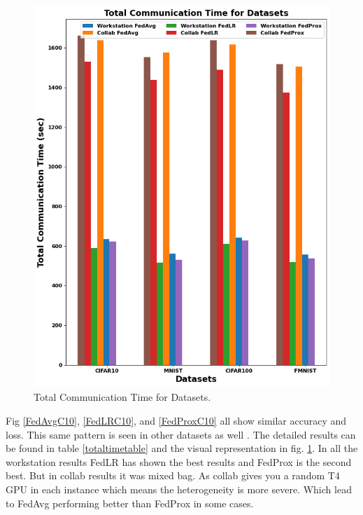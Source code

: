 \documentclass[conference]{IEEEtran}
\begin{document}
\begin{figure}[htp!]
	\centering
	\includegraphics[scale=.4]{Images/Result Images/FinalGraphwithFedprox }
	\caption{Total Communication Time for Datasets.}
	\label{Finalgraph}
\end{figure}


Fig \ref{FedAvgC10}, \ref{FedLRC10}, and \ref{FedProxC10} all show similar accuracy and loss. This same pattern is seen in other datasets as well \cite{lecun1998mnist}  \cite{xiao2017fashionmnistnovelimagedataset} \cite{Krizhevsky09learningmultiple}. The detailed results can be found in table \ref{totaltimetable} and the visual representation in fig. \ref{Finalgraph}. In all the workstation results FedLR has shown the best results and FedProx is the second best. But in collab results it was mixed bag. As collab gives you a random T4 GPU in each instance which means the heterogeneity is more severe. Which lead to FedAvg performing better than FedProx in some cases.
\end{document}
